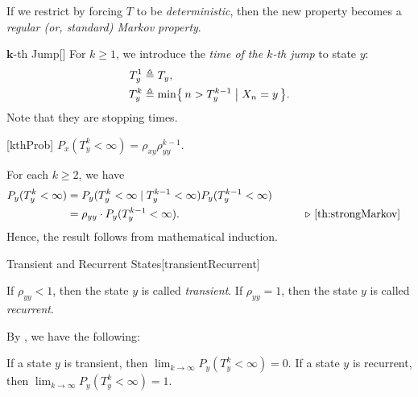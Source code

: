 \documentclass[../probability.tex]{subfiles}
\begin{document}
\begin{note}
    If we restrict 
    by forcing \(T\) to be \emph{deterministic}, then the new property
    becomes a \emph{regular (or, standard) Markov property}.
\end{note}

\begin{Definition}{\(\bm{k}\)-th Jump}[]
    For \(k \ge 1\), we introduce the \emph{time of the \(k\)-th jump} to state \(y\):
    \begin{align*}
        T_y^1 &\triangleq T_y\text, \\
        T_y^{k} &\triangleq \min \bigl\{\,n > T_{y}^{k-1} \bigm| X_n = y\,\bigr\}\text.
    \end{align*}
    Note that they are stopping times.
\end{Definition}

\begin{Lemma}{}[kthProb]
    \(P_x(T_y^k < \infty) = \rho_{xy}\rho_{yy}^{k-1}\).
\end{Lemma}
\begin{myproof}[Proof]
    For each \(k \ge 2\), we have
    \begin{alignat*}{2}
        P_y(T_y^k < \infty)
        &= P_y(T_y^k < \infty \mid T_y^{k-1} < \infty) P_y(T_y^{k-1} < \infty) &\qquad \\
        &= \rho_{yy} \cdot P_y(T_y^{k-1} < \infty)\text. && \comment{\Cref{th:strongMarkov}}
    \end{alignat*}
    Hence, the result follows from mathematical induction.
\end{myproof}

\begin{Definition}{Transient and Recurrent States}[transientRecurrent]
    \begin{itemize}
        \ii
        If \(\rho_{yy} < 1\), then the state \(y\) is called \emph{transient}.
        \ii
        If \(\rho_{yy} = 1\), then the state \(y\) is called \emph{recurrent}.
    \end{itemize}
\end{Definition}

\begin{note}
    By , we have the following:
    \begin{itemize}
        \ii
        If a state \(y\) is transient, then \(\lim_{k \to \infty} P_y(T_y^k < \infty) = 0\).
        \ii
        If a state \(y\) is recurrent, then \(\lim_{k \to \infty} P_y(T_y^k < \infty) = 1\).
    \end{itemize}
\end{note}
\end{document}

